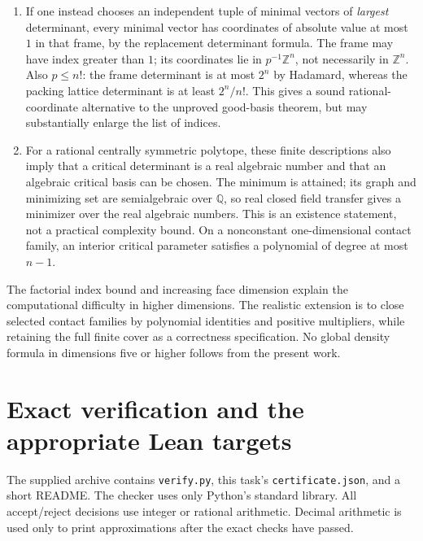 \documentclass[11pt,reqno]{amsart}
\theoremstyle{definition}
\newcommand{\Z}{\mathbb Z}
\newcommand{\Q}{\mathbb Q}
\begin{document}
\begin{enumerate}
\item If one instead chooses an independent tuple of minimal vectors
of \emph{largest} determinant, every minimal vector has coordinates
of absolute value at most $1$ in that frame, by the replacement
determinant formula. The frame may have index greater than $1$;
its coordinates lie in $p^{-1}\Z^n$, not necessarily in $\Z^n$.
Also $p\le n!$: the frame determinant is at most $2^n$ by Hadamard,
whereas the packing lattice determinant is at least $2^n/n!$.
This gives a sound rational-coordinate alternative to the unproved
good-basis theorem, but may substantially enlarge the list of indices.
\item For a rational centrally symmetric polytope, these finite
descriptions also imply that a critical determinant is a real
algebraic number and that an algebraic critical basis can be chosen.
The minimum is attained; its graph and minimizing set are
semialgebraic over $\Q$, so real closed field transfer gives a
minimizer over the real algebraic numbers. This is an existence
statement, not a practical complexity bound. On a nonconstant
one-dimensional contact family, an interior critical parameter
satisfies a polynomial of degree at most $n-1$.
\end{enumerate}

The factorial index bound and increasing face dimension explain the
computational difficulty in higher dimensions. The realistic extension
is to close selected contact families by polynomial identities and
positive multipliers, while retaining the full finite cover as a
correctness specification. No global density formula in dimensions
five or higher follows from the present work.

\section{Exact verification and the appropriate Lean targets}\label{sec:lean}
The supplied archive contains \texttt{verify.py}, this task's
\texttt{certificate.json}, and a short README. The checker uses only
Python's standard library. All accept/reject decisions use integer or
rational arithmetic. Decimal arithmetic is used only to print
approximations after the exact checks have passed.
\end{document}
